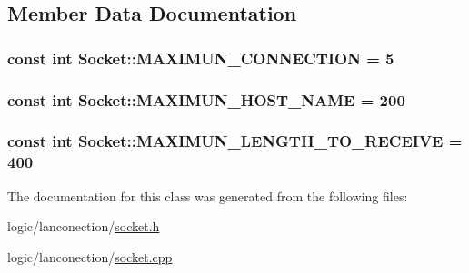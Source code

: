 \subsection{Member Data Documentation}
\hypertarget{class_socket_a7e2ace3442918efea281250bf3833d06}{
\subsubsection[{M\-A\-X\-I\-M\-U\-N\-\_\-\-C\-O\-N\-N\-E\-C\-T\-I\-O\-N}]{\setlength{\rightskip}{0pt plus 5cm}const int Socket\-::\-M\-A\-X\-I\-M\-U\-N\-\_\-\-C\-O\-N\-N\-E\-C\-T\-I\-O\-N = 5\hspace{0.3cm}{\ttfamily [static]}}}\label{class_socket_a7e2ace3442918efea281250bf3833d06}
\hypertarget{class_socket_a41f1845f6cf98d227b32e15f0c9467db}{
\subsubsection[{M\-A\-X\-I\-M\-U\-N\-\_\-\-H\-O\-S\-T\-\_\-\-N\-A\-M\-E}]{\setlength{\rightskip}{0pt plus 5cm}const int Socket\-::\-M\-A\-X\-I\-M\-U\-N\-\_\-\-H\-O\-S\-T\-\_\-\-N\-A\-M\-E = 200\hspace{0.3cm}{\ttfamily [static]}}}\label{class_socket_a41f1845f6cf98d227b32e15f0c9467db}
\hypertarget{class_socket_a95e54f0602448bae84d85145a8720997}{
\subsubsection[{M\-A\-X\-I\-M\-U\-N\-\_\-\-L\-E\-N\-G\-T\-H\-\_\-\-T\-O\-\_\-\-R\-E\-C\-E\-I\-V\-E}]{\setlength{\rightskip}{0pt plus 5cm}const int Socket\-::\-M\-A\-X\-I\-M\-U\-N\-\_\-\-L\-E\-N\-G\-T\-H\-\_\-\-T\-O\-\_\-\-R\-E\-C\-E\-I\-V\-E = 400\hspace{0.3cm}{\ttfamily [static]}}}\label{class_socket_a95e54f0602448bae84d85145a8720997}


The documentation for this class was generated from the following files\-:\begin{DoxyCompactItemize}
\item 
logic/lanconection/\hyperlink{socket_8h}{socket.\-h}\item 
logic/lanconection/\hyperlink{socket_8cpp}{socket.\-cpp}\end{DoxyCompactItemize}
